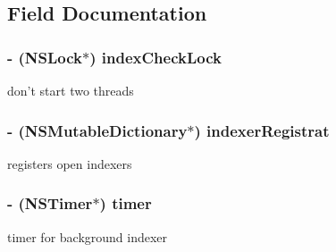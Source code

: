 \subsection{Field Documentation}
\hypertarget{interface_indexing_manager_a0e3ac8fdf6dc5319ccd6eacde9ac823e}{
\subsubsection[{index\-Check\-Lock}]{\setlength{\rightskip}{0pt plus 5cm}-\/ (N\-S\-Lock$\ast$) index\-Check\-Lock\hspace{0.3cm}{\ttfamily [protected]}}}\label{interface_indexing_manager_a0e3ac8fdf6dc5319ccd6eacde9ac823e}
don't start two threads \hypertarget{interface_indexing_manager_a9a3484f0fcbdee9b2555cece4280811b}{
\subsubsection[{indexer\-Registrat}]{\setlength{\rightskip}{0pt plus 5cm}-\/ (N\-S\-Mutable\-Dictionary$\ast$) indexer\-Registrat\hspace{0.3cm}{\ttfamily [protected]}}}\label{interface_indexing_manager_a9a3484f0fcbdee9b2555cece4280811b}
registers open indexers \hypertarget{interface_indexing_manager_a49efd1a3e05e38497c176a4e11fdbaab}{
\subsubsection[{timer}]{\setlength{\rightskip}{0pt plus 5cm}-\/ (N\-S\-Timer$\ast$) timer\hspace{0.3cm}{\ttfamily [protected]}}}\label{interface_indexing_manager_a49efd1a3e05e38497c176a4e11fdbaab}
timer for background indexer 

